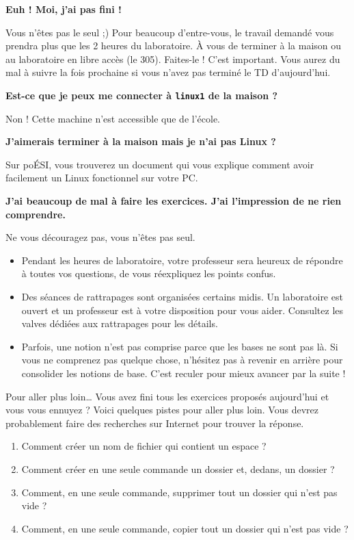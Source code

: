 \documentclass[a4paper,11pt]{style-esi/td}
\begin{document}
	\begin{faq}
		\textbf{Euh ! Moi, j'ai pas fini !}
		
		Vous n'êtes pas le seul ;)
		Pour beaucoup d'entre-vous, 
		le travail demandé vous prendra plus que les 2 heures du laboratoire.
		À vous de terminer à la maison ou au laboratoire en libre accès (le 305).
		Faites-le ! C'est important.
		Vous aurez du mal à suivre la fois prochaine 
		si vous n'avez pas terminé le TD d'aujourd'hui.
		
		\medskip
		\textbf{Est-ce que je peux me connecter à \texttt{linux1} de la maison ?}
		
		Non ! Cette machine n'est accessible que de l'école.

		\medskip
		\textbf{J'aimerais terminer à la maison mais je n'ai pas Linux ?}
		
		Sur poÉSI, vous trouverez un document qui vous explique
		comment avoir facilement un Linux fonctionnel sur votre PC.

		\medskip
		\textbf{J'ai beaucoup de mal à faire les exercices. 
			J'ai l'impression de ne rien comprendre.}
		
		Ne vous découragez pas, vous n'êtes pas seul.
		\begin{itemize}
		\item 
			Pendant les heures de laboratoire, 
			votre professeur sera heureux de répondre à toutes vos questions,
			de vous réexpliquez les points confus.
		\item 
			Des séances de rattrapages sont organisées certains midis.
			Un laboratoire est ouvert et un professeur est à votre disposition
			pour vous aider. 
			Consultez les valves dédiées aux rattrapages pour les détails.
		\item 
			Parfois, une notion n'est pas comprise 
			parce que les bases ne sont pas là.
			Si vous ne comprenez pas quelque chose,
			n'hésitez pas à revenir en arrière pour consolider les notions de base.
			C'est reculer pour mieux avancer par la suite !
		\end{itemize}
	\end{faq}

	\begin{Exercice}{Pour aller plus loin\dots}
		Vous avez fini tous les exercices proposés aujourd'hui
		et vous vous ennuyez ?
		Voici quelques pistes pour aller plus loin.
		Vous devrez probablement faire des recherches sur Internet
		pour trouver la réponse.
		\begin{enumerate}
		\item 
			Comment créer un nom de fichier qui contient un espace ?
		\item 
			Comment créer en une seule commande un dossier 
			et, dedans, un dossier  ?
		\item 
			Comment, en une seule commande, 
			supprimer tout un dossier qui n'est pas vide ?
		\item 
			Comment, en une seule commande, 
			copier tout un dossier qui n'est pas vide ?
		\end{enumerate}
	\end{Exercice}
\end{document}
